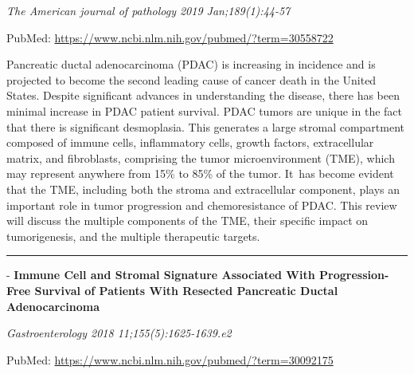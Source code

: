 \documentclass[]{article}
\begin{document}
\emph{The American journal of pathology 2019 Jan;189(1):44-57}

PubMed: \url{https://www.ncbi.nlm.nih.gov/pubmed/?term=30558722}

Pancreatic ductal adenocarcinoma (PDAC) is increasing in incidence and
is projected to become the second leading cause of cancer death in the
United States. Despite significant advances in understanding the
disease, there has been minimal increase in PDAC patient survival. PDAC
tumors are unique in the fact that there is significant desmoplasia.
This generates a large stromal compartment composed of immune cells,
inflammatory cells, growth factors, extracellular matrix, and
fibroblasts, comprising the tumor microenvironment (TME), which may
represent anywhere from 15\% to 85\% of the tumor. It~has become evident
that the TME, including both the stroma and extracellular component,
plays an important role in tumor progression and chemoresistance of
PDAC. This review will discuss the multiple components of the TME, their
specific impact on tumorigenesis, and the multiple therapeutic targets.

{}

{}

\begin{center}\rule{0.5\linewidth}{\linethickness}\end{center}

 - \textbf{Immune Cell and Stromal Signature Associated With
Progression-Free Survival of Patients With Resected Pancreatic Ductal
Adenocarcinoma}

\emph{Gastroenterology 2018 11;155(5):1625-1639.e2}

PubMed: \url{https://www.ncbi.nlm.nih.gov/pubmed/?term=30092175}
\end{document}
